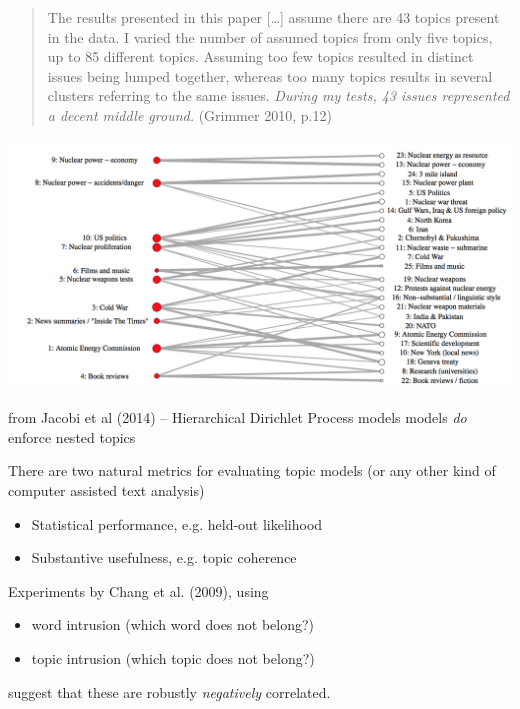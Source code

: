 \documentclass[11pt,compress,professionalfonts]{beamer}
\newcommand{\ita}{\begin{itemize}}
\newcommand{\itm}{\item[]}
\newcommand{\itz}{\end{itemize}}
\begin{document}
%
%
%
%
%


{\small
\begin{quote}
The results presented in this paper [\ldots] assume there are 43 topics present in the data. I varied the number of assumed topics from only five topics, up to 85 different topics. Assuming too few topics resulted in distinct issues being lumped together, whereas too many topics results in several clusters referring to the same issues. \textsl{During my tests, 43 issues represented a decent middle ground.} 
(Grimmer 2010, p.12)
\end{quote}
}


\centerline{\includegraphics[scale=.8]{pictures/nested-topics-nuclear}}

from Jacobi et al (2014) -- Hierarchical Dirichlet Process models models \textit{do} enforce nested topics


There are two natural metrics for evaluating topic models (or any other kind of computer assisted text analysis)
\ita
\itm Statistical performance, e.g. held-out likelihood
\itm Substantive usefulness, e.g. topic coherence
\itz
Experiments by Chang et al. (2009), using
\ita
\itm word intrusion (which word does not belong?)
\itm topic intrusion (which topic does not belong?)
\itz
suggest that these are robustly \textit{negatively} correlated.
\end{document}
